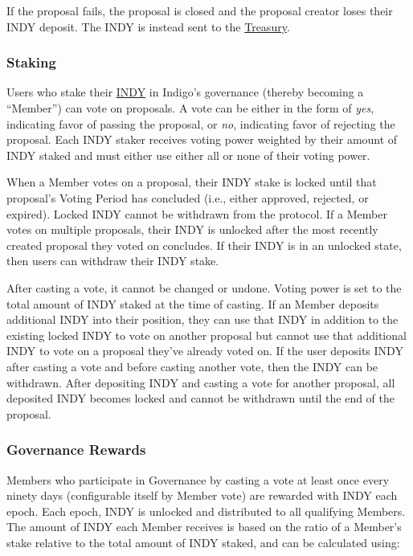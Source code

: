\documentclass{article}
\begin{document}
\begin{sloppypar}
If the proposal fails, the proposal is closed and the proposal creator
loses their INDY deposit. The INDY is instead sent to the
\protect\hyperlink{indigo-dao-treasury}{Treasury}.

\hypertarget{staking}{%
\subsubsection{Staking}\label{staking}}

Users who stake their \protect\hyperlink{indy}{INDY} in Indigo's
governance (thereby becoming a ``Member'') can vote on proposals. A vote
can be either in the form of \emph{yes}, indicating favor of passing the
proposal, or \emph{no}, indicating favor of rejecting the proposal. Each
INDY staker receives voting power weighted by their amount of INDY
staked and must either use either all or none of their voting power.

When a Member votes on a proposal, their INDY stake is locked until that
proposal's Voting Period has concluded (i.e., either approved, rejected,
or expired). Locked INDY cannot be withdrawn from the protocol. If a
Member votes on multiple proposals, their INDY is unlocked after the
most recently created proposal they voted on concludes. If their INDY is
in an unlocked state, then users can withdraw their INDY stake.

After casting a vote, it cannot be changed or undone. Voting power is
set to the total amount of INDY staked at the time of casting. If an
Member deposits additional INDY into their position, they can use that
INDY in addition to the existing locked INDY to vote on another proposal
but cannot use that additional INDY to vote on a proposal they've
already voted on. If the user deposits INDY after casting a vote and
before casting another vote, then the INDY can be withdrawn. After
depositing INDY and casting a vote for another proposal, all deposited
INDY becomes locked and cannot be withdrawn until the end of the
proposal.

\hypertarget{governance-rewards}{%
\subsubsection{Governance Rewards}\label{governance-rewards}}

Members who participate in Governance by casting a vote at least once
every ninety days (configurable itself by Member vote) are rewarded with
INDY each epoch. Each epoch, INDY is unlocked and distributed to all
qualifying Members. The amount of INDY each Member receives is based on
the ratio of a Member's stake relative to the total amount of INDY
staked, and can be calculated using:


\end{sloppypar}
\end{document}
